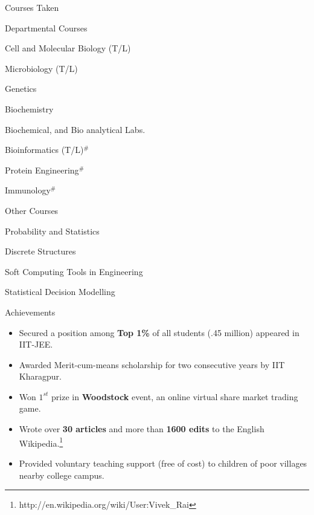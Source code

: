 \documentclass{article}
\newlength{\tabin}
\newlength{\secsep}
\newcommand{\lineunder}{\vspace*{-8pt} \\ \hspace*{-6pt} \hrulefill \\ \vspace*{-15pt}}
\newenvironment{tabbedsection}[1]{
  \begin{list}{}{
      \setlength{\itemsep}{0pt}
      \setlength{\labelsep}{0pt}
      \setlength{\labelwidth}{0pt}
      \setlength{\leftmargin}{\tabin}
      \setlength{\rightmargin}{\tabin}
      \setlength{\listparindent}{0pt}
      \setlength{\parsep}{0pt}
      \setlength{\parskip}{0pt}
      \setlength{\partopsep}{0pt}
      \setlength{\topsep}{#1}
    }
  \item[]
}{\end{list}}
\newenvironment{resume_section}[1]{
  \filbreak
  \vspace{2\secsep}
  \textsc{\large#1}
  \lineunder
  \begin{tabbedsection}{\secsep}
}{\end{tabbedsection}}
\newenvironment{resume_subsection}[2][]{
  \textbf{#2} \hfill {\footnotesize #1} \hspace{1.0em}
  \begin{tabbedsection}{0.5\secsep}
}{\end{tabbedsection}}
\newenvironment{subitems}{
  \renewcommand{\labelitemi}{-}
  \begin{itemize}
      \setlength{\labelsep}{1em}
}{\end{itemize}}
\begin{document}
\begin{resume_section}{Courses Taken}
\begin{resume_subsection}{Departmental Courses}
    \begin{subitems}
        \begin{multicols}{2}
        \item Cell and Molecular Biology (T/L)
        \item Microbiology (T/L)
        \item Genetics
        \item Biochemistry
        \item Biochemical, and Bio analytical Labs.
        \item Bioinformatics (T/L)$^{\#}$
        \item Protein Engineering$^{\#}$
        \item Immunology$^{\#}$
        \end{multicols}
    \end{subitems}
\end{resume_subsection}
\begin{resume_subsection}{Other Courses}
    \begin{subitems}
        \begin{multicols}{2}
        \item Probability and Statistics
        \item Discrete Structures
        \item Soft Computing Tools in Engineering
        \item Statistical Decision Modelling
        \end{multicols}
    \end{subitems}
\end{resume_subsection}
\end{resume_section}

\begin{resume_section}{Achievements}
    \begin{subitems}
      \item Secured a position among \textbf{Top 1\%} of all students (.45 million) appeared in IIT-JEE.
      \item Awarded Merit-cum-means scholarship for two consecutive years by IIT Kharagpur.
      \item Won ${1^{st}}$ prize in \textbf{Woodstock} event, an online virtual share market trading game.
      \item Wrote over \textbf{30 articles} and more than \textbf{1600 edits} to the English Wikipedia.\footnote{http://en.wikipedia.org/wiki/User:Vivek\_Rai}
      \item Provided voluntary teaching support (free of cost) to children of poor villages nearby college campus.
    \end{subitems}
\end{resume_section}
\end{document}
